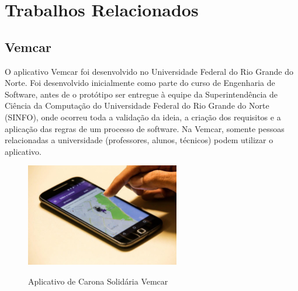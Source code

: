 \chapter{Trabalhos Relacionados}

\section{Vemcar}

O aplicativo Vemcar foi desenvolvido no Universidade Federal do Rio Grande do Norte. Foi desenvolvido inicialmente como parte do curso de Engenharia de Software, antes de o protótipo ser entregue à equipe da Superintendência de Ciência da Computação do Universidade Federal do Rio Grande do Norte (SINFO), onde ocorreu toda a validação da ideia, a criação dos requisitos e a aplicação das regras de um processo de software. Na Vemcar, somente pessoas relacionadas a universidade (professores, alunos, técnicos) podem utilizar o aplicativo.


\begin{figure}[!hbtp]
	\centering
	\caption{Aplicativo de Carona Solidária Vemcar}
	\includegraphics[width=0.6\textwidth]{./04-figuras/vemcar.jpg}
	\label{fig:tecnologia}
\end{figure}

